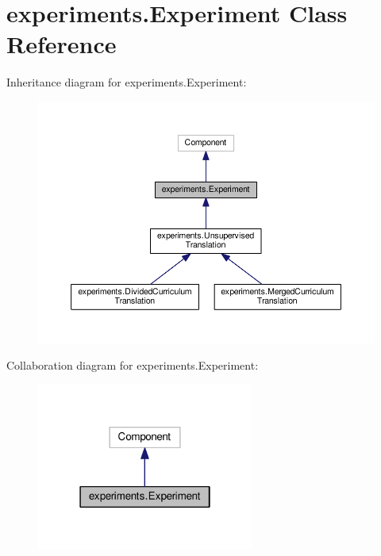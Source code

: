 \hypertarget{classexperiments_1_1Experiment}{}\section{experiments.\+Experiment Class Reference}
\label{classexperiments_1_1Experiment}


Inheritance diagram for experiments.\+Experiment\+:
\nopagebreak
\begin{figure}[H]
\begin{center}
\leavevmode
\includegraphics[width=350pt]{classexperiments_1_1Experiment__inherit__graph}
\end{center}
\end{figure}


Collaboration diagram for experiments.\+Experiment\+:
\nopagebreak
\begin{figure}[H]
\begin{center}
\leavevmode
\includegraphics[width=202pt]{classexperiments_1_1Experiment__coll__graph}
\end{center}
\end{figure}

